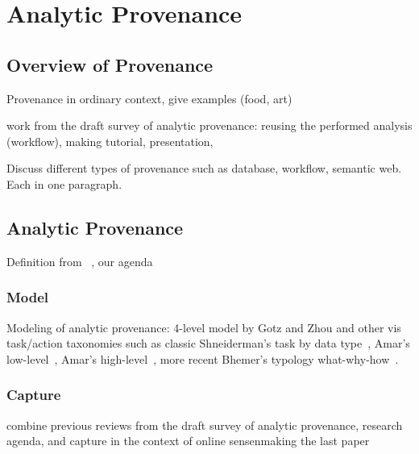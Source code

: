 \section{Analytic Provenance}
\subsection{Overview of Provenance}
Provenance in ordinary context, give examples (food, art)

work from the draft survey of analytic provenance: reusing the performed analysis (workflow), making tutorial, presentation,



Discuss different types of provenance such as database, workflow, semantic web. Each in one paragraph.

\subsection{Analytic Provenance}
Definition from ~\cite{North2011}, our agenda~\cite{Xu2015}

\subsubsection{Model}
Modeling of analytic provenance: 4-level model by Gotz and Zhou and other vis task/action taxonomies such as classic Shneiderman's task by data type~\cite{Shneiderman1996}, Amar's low-level~\cite{Amar2005}, Amar's high-level~\cite{Amar2004}, more recent Bhemer's typology what-why-how~\cite{Brehmer2013}.

\subsubsection{Capture}
combine previous reviews from the draft survey of analytic provenance, research agenda, and capture in the context of online sensenmaking the last paper